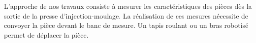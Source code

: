 %
%
%
%
%
%
%
L'approche de nos travaux consiste à mesurer les caractéristiques des pièces dès la sortie de la presse d'injection-moulage.
La réalisation de ces mesures nécessite de convoyer la pièce devant le banc de mesure.
Un tapis roulant ou un bras robotisé permet de déplacer la pièce.

